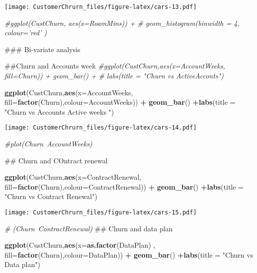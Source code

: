 \documentclass[]{article}
\newenvironment{Shaded}{\begin{snugshade}}{\end{snugshade}}
\newcommand{\KeywordTok}[1]{\textcolor[rgb]{0.13,0.29,0.53}{\textbf{#1}}}
\newcommand{\DataTypeTok}[1]{\textcolor[rgb]{0.13,0.29,0.53}{#1}}
\newcommand{\StringTok}[1]{\textcolor[rgb]{0.31,0.60,0.02}{#1}}
\newcommand{\CommentTok}[1]{\textcolor[rgb]{0.56,0.35,0.01}{\textit{#1}}}
\newcommand{\OperatorTok}[1]{\textcolor[rgb]{0.81,0.36,0.00}{\textbf{#1}}}
\newcommand{\NormalTok}[1]{#1}
\begin{document}
\texttt{[image: CustomerChrurn\_files/figure-latex/cars-13.pdf]}

\begin{Shaded}
\begin{Highlighting}[]
\CommentTok{#ggplot(CustChurn, aes(x=RoamMins)) +}
 \CommentTok{# geom_histogram(binwidth = 4, colour='red' )}


\NormalTok{### Bi-variate analysis }

\NormalTok{##Churn and Accounts week}
\CommentTok{#ggplot(CustChurn,aes(x=AccountWeeks, fill=Churn))  + geom_bar() +}
 \CommentTok{# labs(title = "Churn vs ActiveAcconts")}

\KeywordTok{ggplot}\NormalTok{(CustChurn,}\KeywordTok{aes}\NormalTok{(}\DataTypeTok{x=}\NormalTok{AccountWeeks, }\DataTypeTok{fill=}\KeywordTok{factor}\NormalTok{(Churn),}\DataTypeTok{colour=}\NormalTok{AccountWeeks))  }\OperatorTok{+}\StringTok{ }\KeywordTok{geom_bar}\NormalTok{() }\OperatorTok{+}\KeywordTok{labs}\NormalTok{(}\DataTypeTok{title =} \StringTok{"Churn vs Accounts Active weeks "}\NormalTok{)}
\end{Highlighting}
\end{Shaded}

\texttt{[image: CustomerChrurn\_files/figure-latex/cars-14.pdf]}

\begin{Shaded}
\begin{Highlighting}[]
\CommentTok{#plot(Churn~AccountWeeks)}

\NormalTok{## Churn and COntract renewal}

\KeywordTok{ggplot}\NormalTok{(CustChurn,}\KeywordTok{aes}\NormalTok{(}\DataTypeTok{x=}\NormalTok{ContractRenewal, }\DataTypeTok{fill=}\KeywordTok{factor}\NormalTok{(Churn),}\DataTypeTok{colour=}\NormalTok{ContractRenewal))  }\OperatorTok{+}\StringTok{ }\KeywordTok{geom_bar}\NormalTok{() }\OperatorTok{+}\KeywordTok{labs}\NormalTok{(}\DataTypeTok{title =} \StringTok{"Churn vs Contract Renewal"}\NormalTok{)}
\end{Highlighting}
\end{Shaded}

\texttt{[image: CustomerChrurn\_files/figure-latex/cars-15.pdf]}

\begin{Shaded}
\begin{Highlighting}[]
 \CommentTok{#  (Churn~ContractRenewal)}
\NormalTok{## Churn and data plan}

\KeywordTok{ggplot}\NormalTok{(CustChurn,}\KeywordTok{aes}\NormalTok{(}\DataTypeTok{x=}\KeywordTok{as.factor}\NormalTok{(DataPlan)  , }\DataTypeTok{fill=}\KeywordTok{factor}\NormalTok{(Churn),}\DataTypeTok{colour=}\NormalTok{DataPlan))  }\OperatorTok{+}\StringTok{ }\KeywordTok{geom_bar}\NormalTok{() }\OperatorTok{+}\KeywordTok{labs}\NormalTok{(}\DataTypeTok{title =} \StringTok{"Churn vs Data plan"}\NormalTok{)}
\end{Highlighting}
\end{Shaded}
\end{document}
